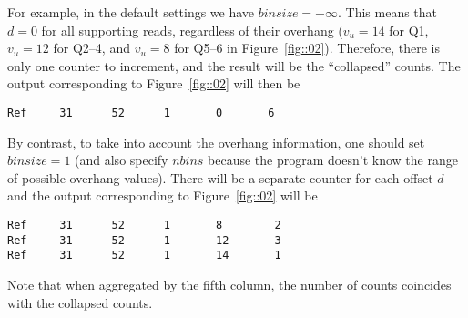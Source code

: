 \documentclass{article}
\begin{document}
For example, in the default settings we have $binsize=+\infty$. This means that $d=0$ for all supporting 
reads, regardless of their overhang ($v_u=14$ for Q1, $v_u=12$ for Q2--4, and $v_u=8$ for Q5--6 in 
Figure~\ref{fig::02}). Therefore, there is only one counter to increment, and the result will be the 
``collapsed'' counts. The output corresponding to Figure~\ref{fig::02} will then be
\begin{verbatim}
Ref     31      52      1       0       6
\end{verbatim}

By contrast, to take into account the overhang information, one should set $binsize=1$ (and also specify $nbins$ 
because the program doesn't know the range of possible overhang values). There will be a separate counter for each 
offset $d$ and the output corresponding to Figure~\ref{fig::02} will be
\begin{verbatim}
Ref     31      52      1       8        2
Ref     31      52      1       12       3
Ref     31      52      1       14       1
\end{verbatim}
Note that when aggregated by the fifth column, the number of counts coincides with the collapsed counts.


\end{document}

